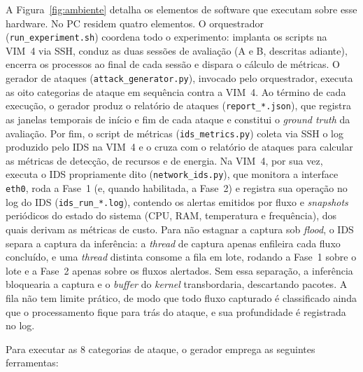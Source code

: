 \documentclass[12pt,a4paper]{article}
\begin{document}
A Figura~\ref{fig:ambiente} detalha os elementos de software que executam sobre
esse hardware. No PC residem quatro elementos. O orquestrador
(\texttt{run\_experiment.sh}) coordena todo o experimento: implanta os scripts na
VIM~4 via SSH, conduz as duas sessões de avaliação (A e B, descritas adiante),
encerra os processos ao final de cada sessão e dispara o cálculo de métricas. O
gerador de ataques (\texttt{attack\_generator.py}), invocado pelo orquestrador,
executa as oito categorias de ataque em sequência contra a VIM~4. Ao término de
cada execução, o gerador produz o relatório de ataques (\texttt{report\_*.json}),
que registra as janelas temporais de início e fim de cada ataque e constitui o
\textit{ground truth} da avaliação. Por fim, o script de métricas
(\texttt{ids\_metrics.py}) coleta via SSH o log produzido pelo IDS na VIM~4 e o
cruza com o relatório de ataques para calcular as métricas de detecção, de
recursos e de energia. Na VIM~4, por sua vez, executa o IDS propriamente dito
(\texttt{network\_ids.py}), que monitora a interface \texttt{eth0}, roda a Fase~1
(e, quando habilitada, a Fase~2) e registra sua operação no log do IDS
(\texttt{ids\_run\_*.log}), contendo os alertas emitidos por fluxo e
\textit{snapshots} periódicos do estado do sistema (CPU, RAM, temperatura e
frequência), dos quais derivam as métricas de custo. Para não estagnar a captura
sob \textit{flood}, o IDS separa a captura da inferência: a \textit{thread} de
captura apenas enfileira cada fluxo concluído, e uma \textit{thread} distinta
consome a fila em lote, rodando a Fase~1 sobre o lote e a Fase~2 apenas sobre os
fluxos alertados. Sem essa separação, a inferência bloquearia a captura e o
\textit{buffer} do \textit{kernel} transbordaria, descartando pacotes. A fila não
tem limite prático, de modo que todo fluxo capturado é classificado ainda que o
processamento fique para trás do ataque, e sua profundidade é registrada no log.

Para executar as 8 categorias de ataque, o gerador emprega as seguintes
ferramentas:
\end{document}
